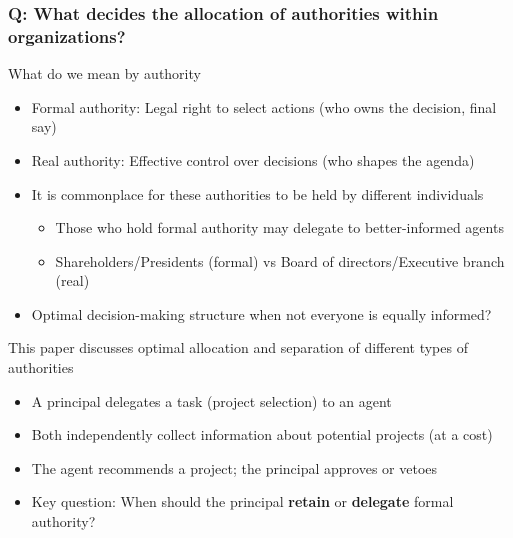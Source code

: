 \documentclass[aspectratio=169]{beamer}
\begin{document}
\begin{frame}
\frametitle{Q: What decides the allocation of authorities within organizations?} 
What do we mean by authority
\begin{itemize}\setlength\itemsep{3pt}
\item Formal authority: Legal right to select actions (who owns the decision, final say)
\item Real authority: Effective control over decisions (who shapes the agenda)
\item  It is commonplace for these authorities to be held by different individuals
\begin{itemize}\setlength\itemsep{3pt}
\item Those who hold formal authority may delegate to better-informed agents
\item Shareholders/Presidents (formal) vs Board of directors/Executive branch (real)
\end{itemize}
\item Optimal decision-making structure when not everyone is equally informed?
\end{itemize}\medskip
This paper discusses optimal allocation and  separation of different types of authorities
\begin{itemize}\setlength\itemsep{3pt}
\item A principal delegates a task (project selection) to an agent
\item Both independently collect information about potential projects (at a cost)
\item The agent recommends a project; the principal approves or vetoes
\item Key question: When should the principal \textbf{retain} or \textbf{delegate} formal authority?
 \end{itemize}
\end{frame}
\end{document}
